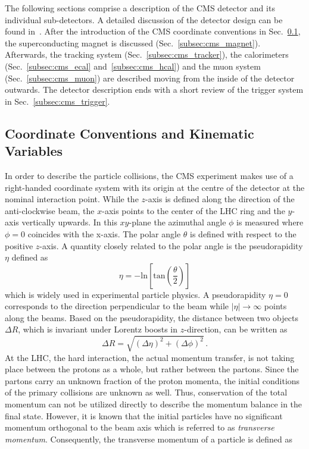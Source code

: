 The following sections comprise a description of the CMS detector and its individual sub-detectors. A detailed discussion of the detector design can be found in~\cite{Chatrchyan:2008zzk, bib:cmsptdr1}. After the introduction of the CMS coordinate conventions in Sec.~\ref{subsec:cms_coordinates}, the superconducting magnet is discussed (Sec.~\ref{subsec:cms_magnet}). Afterwards, the tracking system (Sec.~\ref{subsec:cms_tracker}), the calorimeters (Sec.~\ref{subsec:cms_ecal} and~\ref{subsec:cms_hcal}) and the muon system (Sec.~\ref{subsec:cms_muon}) are described moving from the inside of the detector outwards. The detector description ends with a short review of the trigger system in Sec.~\ref{subsec:cms_trigger}.  

\subsection{Coordinate Conventions and Kinematic Variables}
\label{subsec:cms_coordinates}
In order to describe the particle collisions, the CMS experiment makes use of a right-handed coordinate system with its origin at the centre of the detector at the nominal interaction point. While the $z$-axis is defined along the direction of the anti-clockwise beam, the $x$-axis points to the center of the LHC ring and the $y$-axis vertically upwards. In this $xy$-plane the azimuthal angle $\phi$ is measured where $\phi = 0$ coincides with the x-axis. The polar angle $\theta$ is defined with respect to the positive $z$-axis. A quantity closely related to the polar angle is the pseudorapidity $\eta$ defined as
\begin{equation}
\eta = \mathrm{-ln} \left[\mathrm{tan} \left(\frac{\theta}{2} \right)\right]
\end{equation}
which is widely used in experimental particle physics. A pseudorapidity $\eta = 0$ corresponds to the direction perpendicular to the beam while $|\eta| \rightarrow \infty$ points along the beams. Based on the pseudorapidity, the distance between two objects $\Delta R$, which is invariant under Lorentz boosts in $z$-direction, can be written as
\begin{equation}
\Delta R = \sqrt{(\Delta \eta)^2 + (\Delta \phi)^2} \, .
\end{equation}
At the LHC, the hard interaction, \ie the actual momentum transfer, is not taking place between the protons as a whole, but rather between the partons. Since the partons carry an unknown fraction of the proton momenta, the initial conditions of the primary collisions are unknown as well. Thus, conservation of the total momentum can not be utilized directly to describe the momentum balance in the final state. However, it is known that the initial particles have no significant momentum orthogonal to the beam axis which is referred to as \textit{transverse momentum}. Consequently, the transverse momentum of a particle is defined as 
